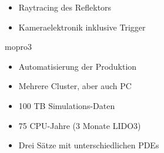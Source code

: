\documentclass[aspectratio=1610, 9pt]{beamer}
\begin{document}
\begin{frame}[c]
\begin{columns}[onlytextwidth, t]
\begin{column}{0.475\textwidth}
      \begin{center}
      \end{center}
      \begin{itemize}
        \item Raytracing des Reflektors
        \item Kameraelektronik inklusive Trigger
      \end{itemize}

      \vspace{0.25cm}
      \begin{center}
        \huge mopro3
      \end{center}
      \begin{itemize}
        \item Automatisierung der Produktion
        \item Mehrere Cluster, aber auch PC
        \item 100 TB Simulations-Daten
        \item 75 CPU-Jahre (3 Monate LIDO3)
        \item Drei Sätze mit unterschiedlichen PDEs
      \end{itemize}
    \end{column}%
  \end{columns}%

\end{frame}
\end{document}
